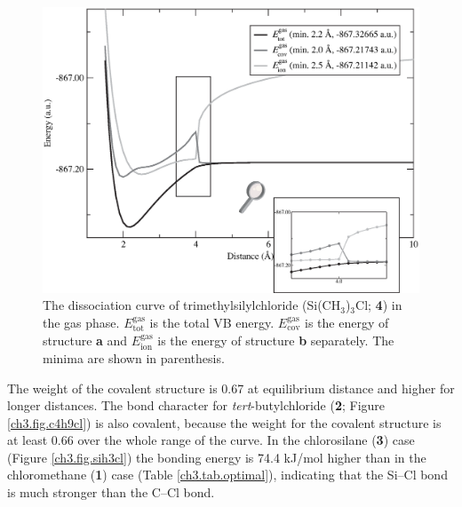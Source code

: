 \begin{figure}[htbp]
\begin{center}
\includegraphics[scale=0.55]{dissociation/figures/c3h9sicl_g.eps}
\end{center}
\caption{The dissociation curve of trimethylsilylchloride (Si(CH$_3$)$_3$Cl; \textbf{4}) in the gas phase. $E_\mathrm{tot}^\mathrm{gas}$ is the total VB energy. $E_\mathrm{cov}^\mathrm{gas}$ is the energy of structure \textbf{a} and $E_\mathrm{ion}^\mathrm{gas}$ is the energy of structure \textbf{b} separately. The minima are shown in parenthesis.}
\label{ch3.fig.c3h9sicl}
\end{figure}
The weight of the covalent structure is 0.67 at equilibrium distance and higher for longer distances. The bond character for \textit{tert}-butylchloride (\textbf{2}; Figure \ref{ch3.fig.c4h9cl}) is also covalent, because the weight for the covalent structure is at least 0.66 over the whole range of the curve.
In the chlorosilane (\textbf{3}) case (Figure \ref{ch3.fig.sih3cl}) the bonding energy is 74.4 kJ/mol higher than in the chloromethane (\textbf{1}) case (Table \ref{ch3.tab.optimal}), indicating that the Si--Cl bond is much stronger than the C--Cl bond. 


